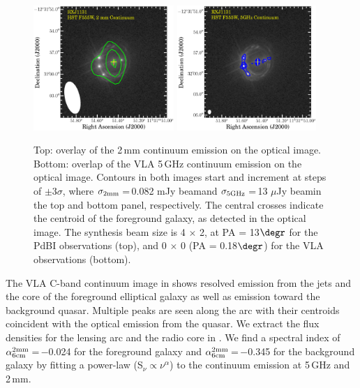 \documentclass[]{emulateapj}
\begin{document}
\begin{figure}[!htbp]
\includegraphics[trim=12 27 0 1, clip, width=0.475\textwidth]{../Figures/F555W_ContPdBI.eps}
\includegraphics[trim=10 5 0 0, clip, width=0.4695\textwidth]{../Figures/F555W_ContVLA.eps}
\caption{Top: overlay of the 2\,mm continuum emission on the optical image.
Bottom: overlap of the VLA 5\,GHz continuum emission on the optical image.
Contours in both images start and increment at steps of
$\pm$3$\sigma$, where $\sigma_{\rm 2mm}$\,=\,0.082 mJy beam\pmOne and
$\sigma_{\rm 5GHz}$\,=\,13 $\mu$Jy beam\pmOne in the top and bottom panel, respectively.
The central crosses indicate the centroid of the foreground galaxy,
as detected in the optical image. 
The synthesis beam size is 4 $\times$ 2, at PA = 13$\degr$ for
the PdBI observations (top), and 
0 $\times$ 0 (PA = 0.18$\degr$) for
the VLA observations (bottom).
\label{fig:cont}}\vspace{0.51em}
\end{figure}

The VLA C-band continuum image in  shows resolved emission from the
jets and the core of the foreground elliptical galaxy
as well as emission toward the background quasar.
Multiple peaks are seen along the arc with their centroids
coincident with the optical emission from the quasar.
We extract the flux densities for the lensing arc and the radio core in .
We find a spectral index of $\alpha^{\rm 2mm}_{\rm 6cm}$\,=\,$-$0.024
for the foreground
galaxy and $\alpha^{\rm 2mm}_{\rm 6cm}$\,=\,$-$0.345
for the background galaxy by fitting a
power-law (S$_\nu \propto \nu^{\alpha}$) to the continuum emission at
5\,GHz and 2\,mm.
\end{document}
